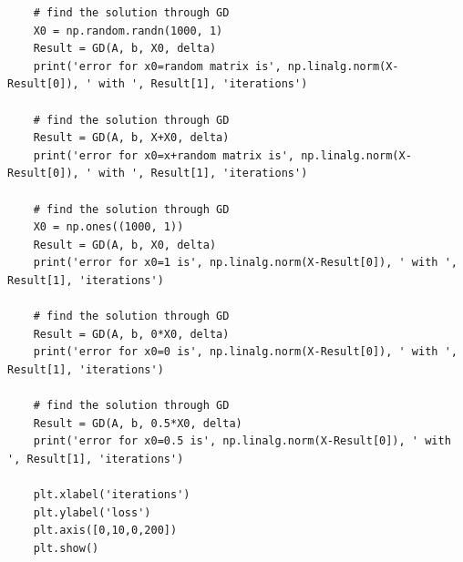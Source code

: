 \documentclass[a4paper]{article}
\begin{document}
\begin{verbatim}
    # find the solution through GD
    X0 = np.random.randn(1000, 1)
    Result = GD(A, b, X0, delta)
    print('error for x0=random matrix is', np.linalg.norm(X-Result[0]), ' with ', Result[1], 'iterations')
    
    # find the solution through GD
    Result = GD(A, b, X+X0, delta)
    print('error for x0=x+random matrix is', np.linalg.norm(X-Result[0]), ' with ', Result[1], 'iterations')
    
    # find the solution through GD
    X0 = np.ones((1000, 1))
    Result = GD(A, b, X0, delta)
    print('error for x0=1 is', np.linalg.norm(X-Result[0]), ' with ', Result[1], 'iterations')
    
    # find the solution through GD
    Result = GD(A, b, 0*X0, delta)
    print('error for x0=0 is', np.linalg.norm(X-Result[0]), ' with ', Result[1], 'iterations')
    
    # find the solution through GD
    Result = GD(A, b, 0.5*X0, delta)
    print('error for x0=0.5 is', np.linalg.norm(X-Result[0]), ' with ', Result[1], 'iterations')
    
    plt.xlabel('iterations')
    plt.ylabel('loss')
    plt.axis([0,10,0,200])
    plt.show()
\end{verbatim}
\end{document}
